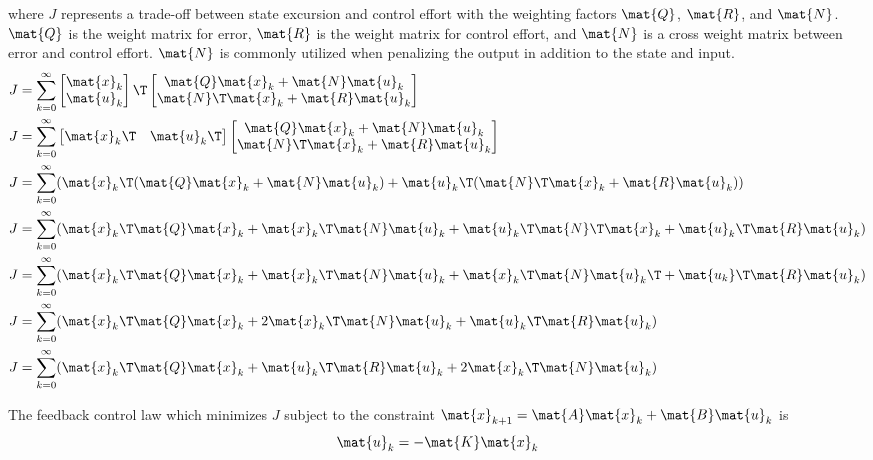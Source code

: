 where $J$ represents a trade-off between \gls{state} excursion and
\gls{control effort} with the weighting factors $\mat{Q}$, $\mat{R}$, and
$\mat{N}$. $\mat{Q}$ is the weight matrix for \gls{error}, $\mat{R}$ is the
weight matrix for \gls{control effort}, and $\mat{N}$ is a cross weight matrix
between \gls{error} and \gls{control effort}. $\mat{N}$ is commonly utilized
when penalizing the output in addition to the state and input.
\begin{align*}
  J &= \sum_{k=0}^\infty
    \begin{bmatrix}
      \mat{x}_k \\
      \mat{u}_k
    \end{bmatrix}\T
    \begin{bmatrix}
      \mat{Q}\mat{x}_k + \mat{N}\mat{u}_k \\
      \mat{N}\T\mat{x}_k + \mat{R}\mat{u}_k
    \end{bmatrix} \\
  J &= \sum_{k=0}^\infty
    \begin{bmatrix}
      \mat{x}_k\T & \mat{u}_k\T
    \end{bmatrix}
    \begin{bmatrix}
      \mat{Q}\mat{x}_k + \mat{N}\mat{u}_k \\
      \mat{N}\T\mat{x}_k + \mat{R}\mat{u}_k
    \end{bmatrix} \\
  J &= \sum_{k=0}^\infty
    (\mat{x}_k\T (\mat{Q}\mat{x}_k + \mat{N}\mat{u}_k) +
      \mat{u}_k\T (\mat{N}\T\mat{x}_k + \mat{R}\mat{u}_k)) \\
  J &= \sum_{k=0}^\infty
    (\mat{x}_k\T\mat{Q}\mat{x}_k + \mat{x}_k\T\mat{N}\mat{u}_k +
      \mat{u}_k\T\mat{N}\T\mat{x}_k + \mat{u}_k\T\mat{R}\mat{u}_k) \\
  J &= \sum_{k=0}^\infty
    (\mat{x}_k\T\mat{Q}\mat{x}_k + \mat{x}_k\T\mat{N}\mat{u}_k +
      \mat{x}_k\T\mat{N}\mat{u}_k\T + \mat{u_k}\T\mat{R}\mat{u}_k) \\
  J &= \sum_{k=0}^\infty
    (\mat{x}_k\T\mat{Q}\mat{x}_k + 2\mat{x}_k\T\mat{N}\mat{u}_k +
      \mat{u}_k\T\mat{R}\mat{u}_k) \\
  J &= \sum_{k=0}^\infty
    (\mat{x}_k\T\mat{Q}\mat{x}_k + \mat{u}_k\T\mat{R}\mat{u}_k +
      2\mat{x}_k\T\mat{N}\mat{u}_k)
\end{align*}

The feedback \gls{control law} which minimizes $J$ subject to the constraint
$\mat{x}_{k+1} = \mat{A}\mat{x}_k + \mat{B}\mat{u}_k$ is
\begin{equation*}
  \mat{u}_k = -\mat{K}\mat{x}_k
\end{equation*}

